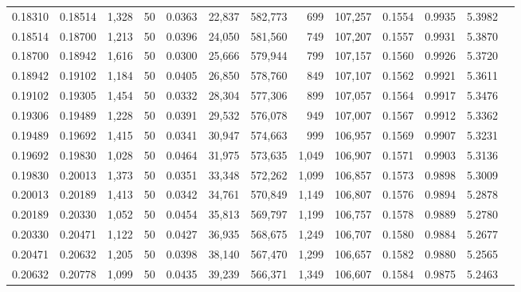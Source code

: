 \begin{tabular}{rrrrrrrrrrrrr}
0.18310 & 0.18514 & 1,328 &  50 &                                     0.0363 &  22,837 & 582,773 &     699 & 107,257 & 0.1554 & 0.9935 & 5.3982 \\
0.18514 & 0.18700 & 1,213 &  50 &                                     0.0396 &  24,050 & 581,560 &     749 & 107,207 & 0.1557 & 0.9931 & 5.3870 \\
0.18700 & 0.18942 & 1,616 &  50 &                                     0.0300 &  25,666 & 579,944 &     799 & 107,157 & 0.1560 & 0.9926 & 5.3720 \\
0.18942 & 0.19102 & 1,184 &  50 &                                     0.0405 &  26,850 & 578,760 &     849 & 107,107 & 0.1562 & 0.9921 & 5.3611 \\
0.19102 & 0.19305 & 1,454 &  50 &                                     0.0332 &  28,304 & 577,306 &     899 & 107,057 & 0.1564 & 0.9917 & 5.3476 \\
0.19306 & 0.19489 & 1,228 &  50 &                                     0.0391 &  29,532 & 576,078 &     949 & 107,007 & 0.1567 & 0.9912 & 5.3362 \\
0.19489 & 0.19692 & 1,415 &  50 &                                     0.0341 &  30,947 & 574,663 &     999 & 106,957 & 0.1569 & 0.9907 & 5.3231 \\
0.19692 & 0.19830 & 1,028 &  50 &                                     0.0464 &  31,975 & 573,635 &   1,049 & 106,907 & 0.1571 & 0.9903 & 5.3136 \\
0.19830 & 0.20013 & 1,373 &  50 &                                     0.0351 &  33,348 & 572,262 &   1,099 & 106,857 & 0.1573 & 0.9898 & 5.3009 \\
0.20013 & 0.20189 & 1,413 &  50 &                                     0.0342 &  34,761 & 570,849 &   1,149 & 106,807 & 0.1576 & 0.9894 & 5.2878 \\
0.20189 & 0.20330 & 1,052 &  50 &                                     0.0454 &  35,813 & 569,797 &   1,199 & 106,757 & 0.1578 & 0.9889 & 5.2780 \\
0.20330 & 0.20471 & 1,122 &  50 &                                     0.0427 &  36,935 & 568,675 &   1,249 & 106,707 & 0.1580 & 0.9884 & 5.2677 \\
0.20471 & 0.20632 & 1,205 &  50 &                                     0.0398 &  38,140 & 567,470 &   1,299 & 106,657 & 0.1582 & 0.9880 & 5.2565 \\
0.20632 & 0.20778 & 1,099 &  50 &                                     0.0435 &  39,239 & 566,371 &   1,349 & 106,607 & 0.1584 & 0.9875 & 5.2463 \\

\end{tabular}
